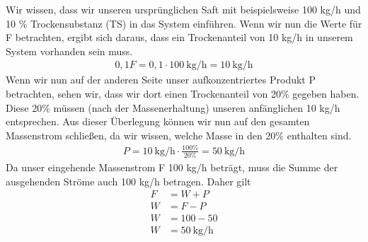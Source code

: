 \documentclass[a4paper,11pt]{article}
\begin{document}
Wir wissen, dass wir unseren ursprünglichen Saft mit beispielsweise 100 kg/h und 10 \% Trockensubstanz (TS) in das System einführen. Wenn wir nun die Werte für F betrachten, ergibt sich daraus, dass ein Trockenanteil von 10 kg/h in unserem System vorhanden sein muss.
\begin{align*}
0,1 F = 0,1 \cdot 100 ~\text{kg/h} = 10 ~\text{kg/h}
\end{align*}
Wenn wir nun auf der anderen Seite unser aufkonzentriertes Produkt P betrachten, sehen wir, dass wir dort einen Trockenanteil von 20\% gegeben haben. Diese 20\% müssen (nach der Massenerhaltung) unseren anfänglichen 10 kg/h entsprechen. Aus dieser Überlegung können wir nun auf den gesamten Massenstrom schließen, da wir wissen, welche Masse in den 20\% enthalten sind.
\begin{align*}
P = 10 ~\text{kg/h} \cdot \frac{100\%}{20\%} = 50 ~\text{kg/h}
\end{align*}
Da unser eingehende Massenstrom F 100 kg/h beträgt, muss die Summe der ausgehenden Ströme auch 100 kg/h betragen. Daher gilt
\begin{align*}
F &= W + P \\ 
W &= F - P \\ 
W &= 100 - 50 \\ 
W &= 50 ~\text{kg/h}
\end{align*}
\end{document}
